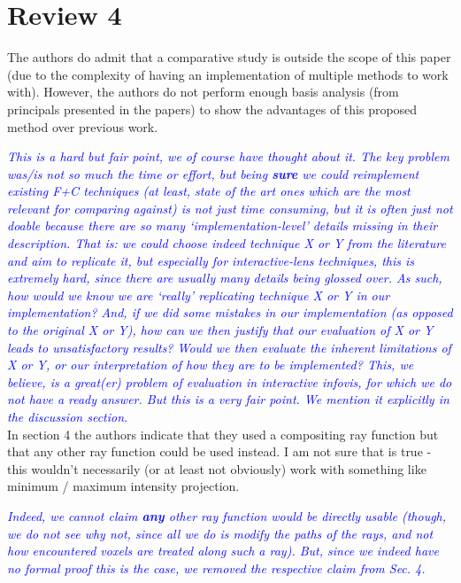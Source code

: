 \documentclass[a4paper,10pt]{article}
\newcommand{\rr}[1]{\emph{\textcolor{blue}{#1}}}
\begin{document}
\section{Review 4}

    The authors do admit that a comparative study
    is outside the scope of this paper (due to the complexity of having an
    implementation of multiple methods to work with). However, the authors do not
    perform enough basis analysis (from principals presented in the papers) to show
    the advantages of this proposed method over previous work.
    
    \rr{This is a hard but fair point, we of course have thought about it. The key problem was/is not so much the time or effort, but being \textbf{sure} we could reimplement existing F+C techniques (at least, state of the art ones which are the most relevant for comparing against) is not just time consuming, but it is often just not doable because there are so many `implementation-level' details missing in their description. That is: we could choose indeed technique X or Y from the literature and aim to replicate it, but especially for interactive-lens techniques, this is extremely hard, since there are usually many details being glossed over. As such, how would we know we are `really' replicating technique X or Y in our implementation? And, if we did some mistakes in our implementation (as opposed to the original X or Y), how can we then justify that our evaluation of X or Y leads to unsatisfactory results? Would we then evaluate the inherent limitations of X or Y, or our interpretation of how they are to be implemented? This, we believe, is a great(er) problem of evaluation in interactive infovis, for which we do not have a ready answer. But this is a very fair point. We mention it explicitly in the discussion section.}\\
    
    In section 4 the authors indicate that they used a compositing ray function but
    that any other ray function could be used instead. I am not sure that is true -
    this wouldn't necessarily (or at least not obviously) work with something like
    minimum / maximum intensity projection.
    
    \rr{Indeed, we cannot claim \textbf{any} other ray function would be directly usable (though, we do not see why not, since all we do is modify the paths of the rays, and not how encountered voxels are treated along such a ray). But, since we indeed have no formal proof this is the case, we removed the respective claim from Sec. 4.}\\
\end{document}
